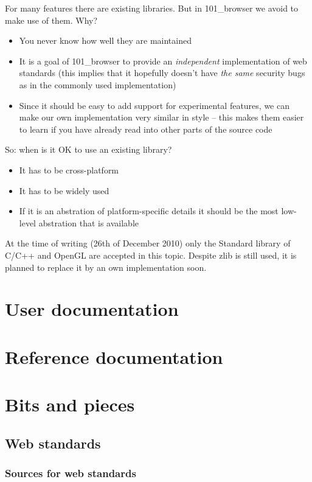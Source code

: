 \documentclass[10pt]{scrbook}
\begin{document}
For many features there are existing libraries. But in 101\_browser we avoid to make use of them. Why?

\begin{itemize}
\item You never know how well they are maintained
\item It is a goal of 101\_browser to provide an \emph{independent} implementation of web standards (this implies that it hopefully doesn't have \emph{the same} security bugs as in the commonly used implementation)
\item Since it should be easy to add support for experimental features, we can make our own implementation very similar in style -- this makes them easier to learn if you have already read into other parts of the source code
\end{itemize}

So: when is it OK to use an existing library?
\begin{itemize}
\item It has to be cross-platform
\item It has to be widely used
\item If it is an abstration of platform-specific details it should be the most low-level abstration that is available
\end{itemize}
At the time of writing (26th of December 2010) only the Standard library of C/C++ and OpenGL are accepted in this topic. Despite zlib is still used, it is planned to replace it by an own implementation soon.

\part{User documentation}

\part{Reference documentation}

\part{Bits and pieces}

\chapter{Web standards}

\section{Sources for web standards}
\end{document}
